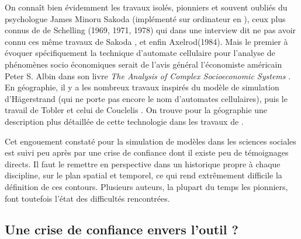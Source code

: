 On connaît bien évidemment les travaux isolés, pionniers et souvent oubliés \autocites{Hegselmann2012, Aydinonat2007} du psychologue James Minoru Sakoda \autocite{Sakoda1949} (implémenté sur ordinateur en \autocite{Sakoda1971}), ceux plus connus de de Schelling (1969, 1971, 1978) \autocite{Ganguly2003} qui dans une interview dit ne pas avoir connu ces même travaux de Sakoda \autocite{Aydinonat2005}, et enfin Axelrod(1984). Mais le premier à évoquer spécifiquement la technique d'automate cellulaire pour l'analyse de phénomènes socio économiques serait de l'avis général l'économiste américain Peter S. Albin dans son livre \textit{The Analysis of Complex Socioeconomic Systems} \textcites{Smith1976, Ganguly2003}.  En géographie, il y a les nombreux travaux inspirés du modèle de simulation d'Hägerstrand (qui ne porte pas encore le nom d'automates cellulaires), puis le travail de Tobler \autocites{Tobler1970b, Tobler1979} et celui de Couclelis \autocite{Couclelis1985}. On trouve pour la géographie une description plus détaillée de cette technologie dans les travaux de \textcite{Louail2010}.



Cet engouement constaté pour la simulation de modèles dans les sciences sociales est suivi peu après par une crise de confiance dont il existe peu de témoignages directs. Il faut le remettre en perspective dans un historique propre à chaque discipline, sur le plan spatial et temporel, ce qui rend extrêmement difficile la définition de ces contours. Plusieurs auteurs, la plupart du temps les pionniers, font toutefois l'état des difficultés rencontrées.


\subsection{Une crise de confiance envers l'outil ?}
\label{sec:critiques_simulation}

